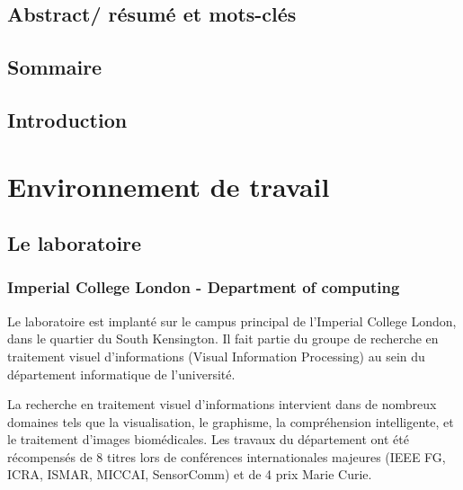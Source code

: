 \documentclass[10pt]{report}
\begin{document}
\section*{Abstract/ résumé et mots-clés} %
\section*{Sommaire}
\tableofcontents

\section*{Introduction}

\chapter{Environnement de travail} 
	\section{Le laboratoire}
	\subsection{Imperial College London - Department of computing}
	Le laboratoire est implanté sur le campus principal de l'Imperial College London, dans le quartier du South Kensington. Il fait partie du groupe de recherche en traitement visuel d'informations (Visual Information Processing) au sein du département informatique de l'université.
	
	
	La recherche en traitement visuel d'informations intervient dans de nombreux domaines tels que la visualisation, le graphisme, la compréhension intelligente, et le traitement d'images biomédicales.  
	Les travaux du département ont été récompensés de 8 titres lors de conférences internationales majeures (IEEE FG, ICRA, ISMAR, MICCAI, SensorComm) et de 4 prix Marie Curie.
		
\end{document}
